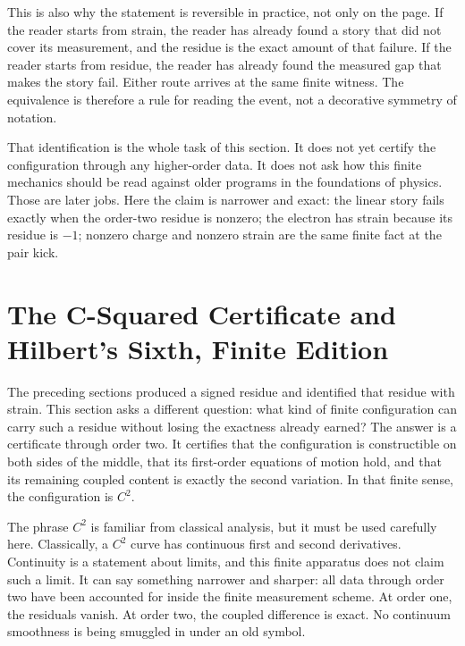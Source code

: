 This is also why the statement is reversible in practice, not only on the page.
If the reader starts from strain, the reader has already found a story that did
not cover its measurement, and the residue is the exact amount of that failure.
If the reader starts from residue, the reader has already found the measured
gap that makes the story fail. Either route arrives at the same finite witness.
The equivalence is therefore a rule for reading the event, not a decorative
symmetry of notation.

That identification is the whole task of this section. It does not yet certify
the configuration through any higher-order data. It does not ask how this finite
mechanics should be read against older programs in the foundations of physics.
Those are later jobs. Here the claim is narrower and exact: the linear story
fails exactly when the order-two residue is nonzero; the electron has strain
because its residue is \(-1\); nonzero charge and nonzero strain are the same
finite fact at the pair kick.

\section{The C-Squared Certificate and Hilbert's Sixth, Finite Edition}

The preceding sections produced a signed residue and identified that residue
with strain. This section asks a different question: what kind of finite
configuration can carry such a residue without losing the exactness already
earned? The answer is a certificate through order two. It certifies that the
configuration is constructible on both sides of the middle, that its
first-order equations of motion hold, and that its remaining coupled content is
exactly the second variation. In that finite sense, the configuration is
\(C^2\).

The phrase \(C^2\) is familiar from classical analysis, but it must be used
carefully here. Classically, a \(C^2\) curve has continuous first and second
derivatives. Continuity is a statement about limits, and this finite apparatus
does not claim such a limit. It can say something narrower and sharper: all
data through order two have been accounted for inside the finite measurement
scheme. At order one, the residuals vanish. At order two, the coupled
difference is exact. No continuum smoothness is being smuggled in under an old
symbol.

